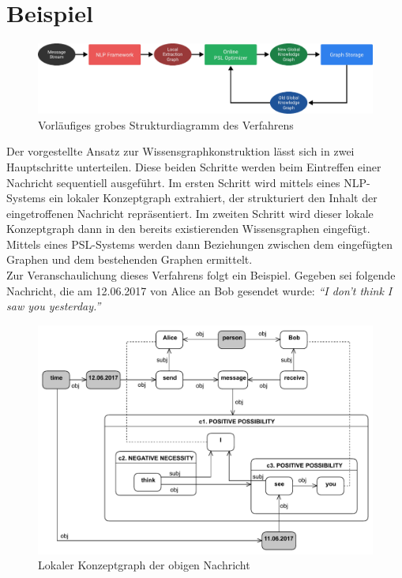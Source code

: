 \documentclass[11pt, a4paper]{scrreprt}
\begin{document}
\section*{Beispiel}

\begin{figure}[h]
	\centering
	\includegraphics[width=\linewidth]{assets/overview}
	\caption{Vorläufiges grobes Strukturdiagramm des Verfahrens}\label{fig:overview}
\end{figure}

Der vorgestellte Ansatz zur Wissensgraphkonstruktion lässt sich in zwei Hauptschritte unterteilen.
Diese beiden Schritte werden beim Eintreffen einer Nachricht sequentiell ausgeführt.
Im ersten Schritt wird mittels eines NLP-Systems ein lokaler Konzeptgraph extrahiert, der strukturiert den Inhalt der eingetroffenen Nachricht repräsentiert.
Im zweiten Schritt wird dieser lokale Konzeptgraph dann in den bereits existierenden Wissensgraphen eingefügt.
Mittels eines PSL-Systems werden dann Beziehungen zwischen dem eingefügten Graphen und dem bestehenden Graphen ermittelt.\\

Zur Veranschaulichung dieses Verfahrens folgt ein Beispiel.
Gegeben sei folgende Nachricht, die am 12.06.2017 von Alice an Bob gesendet wurde:
\emph{``I don't think I saw you yesterday.''}

\begin{figure}[h]
	\centering
	\includegraphics[width=0.8\linewidth]{assets/exampleExtractionGraph}
	\caption{Lokaler Konzeptgraph der obigen Nachricht}\label{fig:exampleExtractionGraph}
\end{figure}
\end{document}
